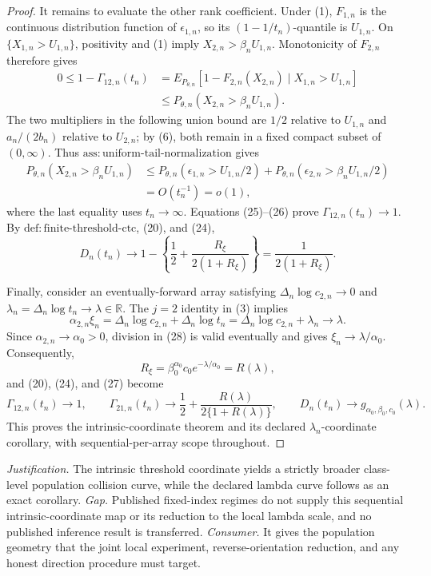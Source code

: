 \documentclass{article}
\begin{document}
\begin{proof}
It remains to evaluate the other rank coefficient. Under (1), \(F_{1,n}\) is the continuous distribution function of \(\epsilon_{1,n}\), so its \((1-1/t_n)\)-quantile is \(U_{1,n}\). On \(\{X_{1,n}>U_{1,n}\}\), positivity and (1) imply \(X_{2,n}>\beta_nU_{1,n}\). Monotonicity of \(F_{2,n}\) therefore gives
\[
\begin{aligned}
0\leq1-\Gamma_{12,n}(t_n)
&=E_{P_{\theta,n}}[1-F_{2,n}(X_{2,n})\mid X_{1,n}>U_{1,n}]\\
&\leq P_{\theta,n}(X_{2,n}>\beta_nU_{1,n}).
\end{aligned}
\tag{25}
\]
The two multipliers in the following union bound are \(1/2\) relative to \(U_{1,n}\) and \(a_n/(2b_n)\) relative to \(U_{2,n}\); by (6), both remain in a fixed compact subset of \((0,\infty)\). Thus \(\mathrm{ass{:}uniform\text{-}tail\text{-}normalization}\) gives
\[
\begin{aligned}
P_{\theta,n}(X_{2,n}>\beta_nU_{1,n})
&\leq P_{\theta,n}(\epsilon_{1,n}>U_{1,n}/2)
+P_{\theta,n}(\epsilon_{2,n}>\beta_nU_{1,n}/2)\\
&=O(t_n^{-1})=o(1),
\end{aligned}
\tag{26}
\]
where the last equality uses \(t_n\to\infty\). Equations (25)--(26) prove \(\Gamma_{12,n}(t_n)\to1\). By \(\mathrm{def{:}finite\text{-}threshold\text{-}ctc}\), (20), and (24),
\[
D_n(t_n)
\longrightarrow
1-\left\{\frac12+\frac{R_\xi}{2(1+R_\xi)}\right\}
=\frac{1}{2(1+R_\xi)}.
\tag{27}
\]

Finally, consider an eventually-forward array satisfying \(\Delta_n\log c_{2,n}\to0\) and \(\lambda_n=\Delta_n\log t_n\to\lambda\in\mathbb R\). The \(j=2\) identity in (3) implies
\[
\alpha_{2,n}\xi_n
=\Delta_n\log c_{2,n}+\Delta_n\log t_n
=\Delta_n\log c_{2,n}+\lambda_n
\longrightarrow\lambda.
\tag{28}
\]
Since \(\alpha_{2,n}\to\alpha_0>0\), division in (28) is valid eventually and gives \(\xi_n\to\lambda/\alpha_0\). Consequently,
\[
R_\xi
=\beta_0^{\alpha_0}c_0e^{-\lambda/\alpha_0}
=R(\lambda),
\tag{29}
\]
and (20), (24), and (27) become
\[
\Gamma_{12,n}(t_n)\to1,
\qquad
\Gamma_{21,n}(t_n)\to\frac12+\frac{R(\lambda)}{2\{1+R(\lambda)\}},
\qquad
D_n(t_n)\to g_{\alpha_0,\beta_0,c_0}(\lambda).
\]
This proves the intrinsic-coordinate theorem and its declared \(\lambda_n\)-coordinate corollary, with sequential-per-array scope throughout.
\end{proof}
\par\smallskip\noindent \textit{Justification.} The intrinsic threshold coordinate yields a strictly broader class-level population collision curve, while the declared lambda curve follows as an exact corollary. \textit{Gap.} Published fixed-index regimes do not supply this sequential intrinsic-coordinate map or its reduction to the local lambda scale, and no published inference result is transferred. \textit{Consumer.} It gives the population geometry that the joint local experiment, reverse-orientation reduction, and any honest direction procedure must target.
\end{document}
